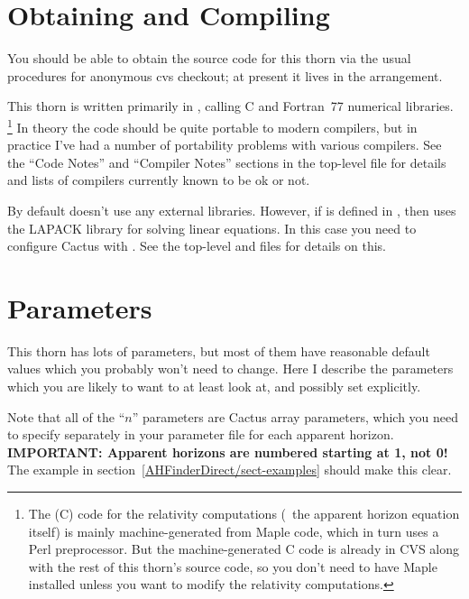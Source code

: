 
\section{Obtaining and Compiling }

You should be able to obtain the source code for this thorn via the
usual procedures for anonymous cvs checkout; at present it lives in
the  arrangement.

This thorn is written primarily in \Cplusplus{}, calling C and
Fortran~77 numerical libraries.%
\footnote{%
	 The (C) code for the relativity computations
	 (\ie{}~the apparent horizon equation itself)
	 is mainly machine-generated from Maple code,
	 which in turn uses a Perl preprocessor.
	 But the machine-generated C code is already
	 in CVS along with the rest of this thorn's
	 source code, so you don't need to have Maple
	 installed unless you want to modify the
	 relativity computations.%
	 }%
{}  In theory the code should be quite portable to modern \Cplusplus{}
compilers, but in practice I've had a number of portability problems
with various compilers.  See the ``Code Notes'' and ``Compiler Notes''
sections in the top-level  file for details and lists of
compilers currently known to be ok or not.

By default  doesn't use any external libraries.
However, if  is defined in
, then  uses the
LAPACK library for solving linear equations.  In this case you need
to configure Cactus with .  See the top-level
 and  files for details on this.


\section{ Parameters}

This thorn has lots of parameters, but most of them have reasonable
default values which you probably won't need to change.  Here I describe
the parameters which you are likely to want to at least look at, and
possibly set explicitly.

Note that all of the ``\code{[}$n$\code{]}'' parameters are Cactus
array parameters, which you need to specify separately in your parameter
file for each apparent horizon.  {\bf IMPORTANT: Apparent horizons are
numbered starting at 1, not 0!}  The example in
section~\ref{AHFinderDirect/sect-examples} should make this clear.

